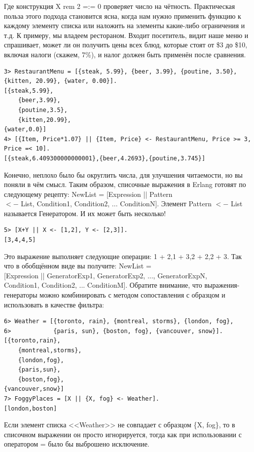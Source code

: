 \documentclass[a4paper,12pt]{report}
\newcommand{\ops}{\colorbox{lgreen}}
\begin{document}
Где конструкция \ops{X rem 2 =:= 0} проверяет число на чётность. Практическая польза этого подхода становится ясна, когда нам нужно применить функцию к каждому элементу списка или наложить на элементы какие\--либо ограничения и т.д. К примеру, мы владеем рестораном. Входит посетитель, видит наше меню и спрашивает, может ли он получить цены всех блюд, которые стоят от \$3 до \$10, включая налоги (скажем, 7\%), и налог должен быть применён после сравнения.
\begin{lstlisting}[style=repl]
3> RestaurantMenu = [{steak, 5.99}, {beer, 3.99}, {poutine, 3.50}, {kitten, 20.99}, {water, 0.00}].
[{steak,5.99},
    {beer,3.99},
    {poutine,3.5},
    {kitten,20.99},
{water,0.0}]
4> [{Item, Price*1.07} || {Item, Price} <- RestaurantMenu, Price >= 3, Price =< 10].
[{steak,6.409300000000001},{beer,4.2693},{poutine,3.745}]
\end{lstlisting}

Конечно, неплохо было бы округлить числа, для улучшения читаемости, но вы поняли в чём смысл. Таким образом, списочные выражения в Erlang готовят по следующему рецепту: \ops{NewList = [Expression || Pattern}\\ 
\ops{ $<-$ List, Condition1, Condition2, ... ConditionN]}. Элемент \ops{Pattern $<-$ List} называется Генератором. И их может быть несколько!\\ 
\begin{lstlisting}[style=repl]
5> [X+Y || X <- [1,2], Y <- [2,3]].
[3,4,4,5]
\end{lstlisting}

Это выражение выполняет следующие операции: \ops{1 + 2},\ops{1 + 3},\ops{2 + 2},\ops{2 + 3}. Так что в обобщённом виде вы получите: \ops{NewList = }\\ 
\ops{[Expression || GeneratorExp1, GeneratorExp2, ..., GeneratorExpN,}\\ 
\ops{Condition1, Condition2, ... ConditionM]}. Обратите внимание, что выражения\--генераторы можно комбинировать с методом сопоставления с образцом и использовать в качестве фильтра:
\begin{lstlisting}[style=repl]
6> Weather = [{toronto, rain}, {montreal, storms}, {london, fog},  
6>            {paris, sun}, {boston, fog}, {vancouver, snow}].
[{toronto,rain},
    {montreal,storms},
    {london,fog},
    {paris,sun},
    {boston,fog},
{vancouver,snow}]
7> FoggyPlaces = [X || {X, fog} <- Weather].
[london,boston]
\end{lstlisting}

Если элемент списка <<Weather>> не совпадает с образцом \{X, fog\}, то в списочном выражении он просто игнорируется, тогда как при использовании с оператором \ops{=} было бы выброшено исключение.
\end{document}

